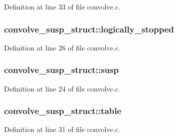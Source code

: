 Definition at line 33 of file convolve.\+c.

\subsubsection[{\texorpdfstring{logically\+\_\+stopped}{logically_stopped}}]{ convolve\+\_\+susp\+\_\+struct\+::logically\+\_\+stopped}\hypertarget{structconvolve__susp__struct_a3181f6fe8e2f0b1c7195e6ef27d00981}{}\label{structconvolve__susp__struct_a3181f6fe8e2f0b1c7195e6ef27d00981}


Definition at line 26 of file convolve.\+c.

\subsubsection[{\texorpdfstring{susp}{susp}}]{ convolve\+\_\+susp\+\_\+struct\+::susp}\hypertarget{structconvolve__susp__struct_ad069eba09ee037919e50a17a2786e4e5}{}\label{structconvolve__susp__struct_ad069eba09ee037919e50a17a2786e4e5}


Definition at line 24 of file convolve.\+c.

\subsubsection[{\texorpdfstring{table}{table}}]{ convolve\+\_\+susp\+\_\+struct\+::table}\hypertarget{structconvolve__susp__struct_a2a448a41f7aed958bdce396c38ebef54}{}\label{structconvolve__susp__struct_a2a448a41f7aed958bdce396c38ebef54}


Definition at line 31 of file convolve.\+c.

